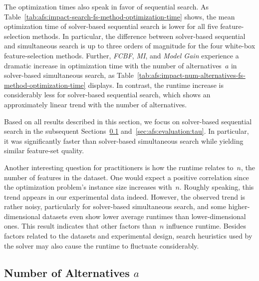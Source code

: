 \documentclass{article}
\theoremstyle{definition}
\begin{document}
The optimization times also speak in favor of sequential search.
As Table~\ref{tab:afs:impact-search-fs-method-optimization-time} shows, the mean optimization time of solver-based sequential search is lower for all five feature-selection methods.
In particular, the difference between solver-based sequential and simultaneous search is up to three orders of magnitude for the four white-box feature-selection methods.
Further, \emph{FCBF}, \emph{MI}, and \emph{Model Gain} experience a dramatic increase in optimization time with the number of alternatives~$a$ in solver-based simultaneous search, as Table~\ref{tab:afs:impact-num-alternatives-fs-method-optimization-time} displays.
In contrast, the runtime increase is considerably less for solver-based sequential search, which shows an approximately linear trend with the number of alternatives.

Based on all results described in this section, we focus on solver-based sequential search in the subsequent Sections~\ref{sec:afs:evaluation:num-alternatives} and~\ref{sec:afs:evaluation:tau}.
In particular, it was significantly faster than solver-based simultaneous search while yielding similar feature-set quality.

Another interesting question for practitioners is how the runtime relates to~$n$, the number of features in the dataset.
One would expect a positive correlation since the optimization problem's instance size increases with~$n$.
Roughly speaking, this trend appears in our experimental data indeed.
However, the observed trend is rather noisy, particularly for solver-based simultaneous search, and some higher-dimensional datasets even show lower average runtimes than lower-dimensional ones.
This result indicates that other factors than~$n$ influence runtime.
Besides factors related to the datasets and experimental design, search heuristics used by the solver may also cause the runtime to fluctuate considerably.

\subsection{Number of Alternatives \texorpdfstring{$a$}{}}
\label{sec:afs:evaluation:num-alternatives}
\end{document}

